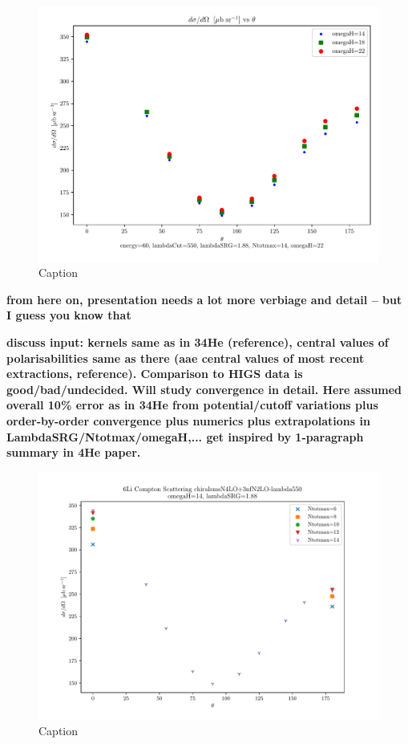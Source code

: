 \documentclass[a4paper,11pt]{article}
\newcommand{\com}[1]{\color{blue}\small\textbf{ #1 }\color{black}\normalsize}
\begin{document}
\begin{figure}[H]
  \centering
  \includegraphics[scale=0.5]{6Li-omegaH-vary.pdf}
  \caption{Caption}
  \label{fig:label1}
\end{figure}

\com{from here on, presentation needs a lot more verbiage and detail -- but I guess you know that}

\com{discuss input: kernels same as in 34He (reference), central values of polarisabilities same as there (aae central values of most recent extractions, reference). Comparison to HIGS data is good/bad/undecided. Will study convergence in detail. Here assumed overall 10\% error as in 34He from potential/cutoff variations plus order-by-order convergence plus numerics plus extrapolations in LambdaSRG/Ntotmax/omegaH,... get inspired by 1-paragraph summary in 4He paper. }

\begin{figure}[H]
  \centering
  \includegraphics[scale=0.5]{6Li-Ntotmax-vary-omegaH14.pdf}
  \caption{Caption}
  \label{fig:label2}
\end{figure}
\end{document}
